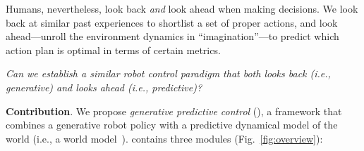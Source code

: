 Humans, nevertheless, look back \emph{and} look ahead when making decisions. We look back at similar past experiences to shortlist a set of proper actions, and look ahead---unroll the environment dynamics in ``imagination''---to predict which action plan is optimal in terms of certain metrics. 

\emph{Can we establish a similar robot control paradigm that both looks back (i.e., generative) and looks ahead (i.e., predictive)?}

\textbf{Contribution}. We propose \emph{generative predictive control} (\nameshort), a framework that combines a generative robot policy with a predictive dynamical model of the world (i.e., a world model~\cite{ha2018world}). \nameshort contains three modules (\cf Fig.~\ref{fig:overview}):
